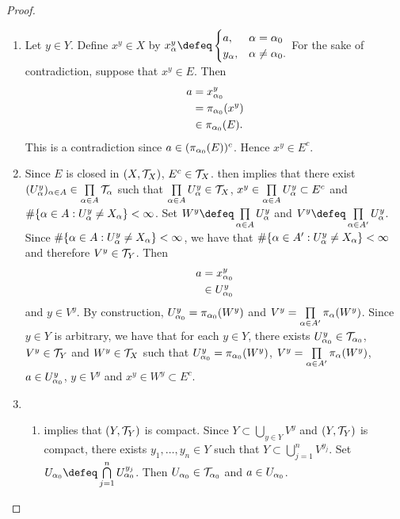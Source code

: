 \documentclass{book}
\begin{document}
 	\begin{proof}\
 		\begin{enumerate}
 			\item Let $y \in Y$. Define $x^y \in X$ by $x^y_{\al} \defeq 
 			\begin{cases}
 				a, & \al = \al_0 \\
 				y_{\al}, & \al \neq \al_0. 
 			\end{cases}
 			$
 			For the sake of contradiction, suppose that $x^y \in E$. Then 
 			\begin{align*}
 				a
 				& = x^y_{\alpha_0} \\
 				& = \pi_{\alpha_0}(x^y) \\
 				& \in \pi_{\alpha_0}(E).
 			\end{align*}
 			This is a contradiction since $a \in (\pi_{\alpha_0}(E))^c$. Hence $x^y \in E^c$. 
 			\item Since $E$ is closed in $(X, \mathcal{T}_X)$, $E^c \in \mathcal{T}_X$.  then implies that there exist $(U^y_{\alpha})_{\alpha \in A} \in \prod\limits_{\alpha \in A} \mathcal{T}_{\alpha}$ such that $\prod\limits_{\alpha \in A} U^y_{\alpha} \in \mathcal{T}_X$, $x^y \in \prod\limits_{\alpha \in A} U^y_{\alpha} \subset E^c$ and $\# \{\alpha \in A: U^y_{\alpha} \neq X_{\alpha}\} < \infty$. Set $W^y \defeq \prod\limits_{\al \in A} U^y_{\al}$ and $V^y \defeq \prod\limits_{\al \in A'}U^y_{\al}$. Since $\# \{\alpha \in A: U^y_{\alpha} \neq X_{\alpha}\} < \infty$, we have that $\# \{\alpha \in A': U^y_{\alpha} \neq X_{\alpha}\} < \infty$ and therefore $V^y \in \mathcal{T}_Y$. Then 
 			\begin{align*}
 				a
 				& = x^y_{\alpha_0} \\
 				& \in U^y_{\alpha_0} 
 			\end{align*}
 			and $y \in V^y$. By construction, $U^y_{\alpha_0} = \pi_{\alpha_0}(W^y)$ and $V^y = \prod\limits_{\alpha \in A'} \pi_{\alpha}(W^y)$. Since $y \in Y$ is arbitrary, we have that for each $y \in Y$, there exists $U^y_{\alpha_0} \in \mathcal{T}_{\alpha_0}$, $V^y \in \mathcal{T}_Y$ and $W^y \in \mathcal{T}_X$ such that $U^y_{\alpha_0} = \pi_{\alpha_0}(W^y)$, $V^y = \prod\limits_{\alpha \in A'} \pi_{\alpha}(W^y)$, $a \in U^y_{\alpha_0}$, $y \in V^y$ and $x^y \in W^y \subset E^c$.
 			\item 
 			\begin{enumerate}
 				\item {} implies that $(Y, \mathcal{T}_Y)$ is compact. Since $Y \subset \bigcup\limits_{y \in Y} V^y$ and $(Y, \mathcal{T}_Y)$ is compact, there exists $y_1, \ldots, y_n \in Y$ such that $Y \subset \bigcup\limits_{j=1}^n V^{y_j}$. Set $U_{\al_0} \defeq \bigcap\limits_{j=1}^n U^{y_j}_{\al_0}$. Then $U_{\alpha_0} \in \mathcal{T}_{\alpha_0}$ and $a \in U_{\alpha_0}$. 

\end{enumerate}
\end{enumerate}
\end{proof}
\end{document}
